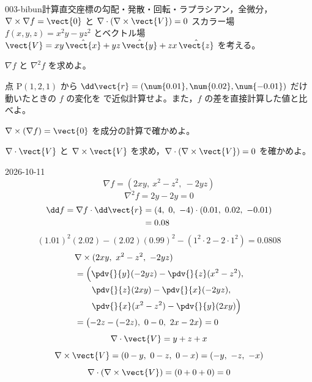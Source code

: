 \documentclass[uplatex,dvipdfmx,a4paper,11pt]{jsarticle}
\begin{document}
\begin{mondai}{003-bibun}{計算}{直交座標の勾配・発散・回転・ラプラシアン，全微分，$\nabla\times\nabla f = \vect{0}$ と $\nabla\cdot(\nabla\times\vect{V}) = 0$}
スカラー場 $f(x,y,z) = x^2y - yz^2$ とベクトル場 $\vect{V} = xy\,\hat{\vect{x}} + yz\,\hat{\vect{y}} + zx\,\hat{\vect{z}}$ を考える。
  \begin{shoumon}
    \item $\nabla f$ と $\nabla^2 f$ を求めよ。
    \item 点 $\mathrm{P}(1,2,1)$ から $\dd\vect{r} = (\num{0.01}, \num{0.02}, \num{-0.01})$ だけ動いたときの $f$ の変化を  で近似計算せよ。また，$f$ の差を直接計算した値と比べよ。
    \item $\nabla\times(\nabla f) = \vect{0}$ を成分の計算で確かめよ。
    \item $\nabla\cdot\vect{V}$ と $\nabla\times\vect{V}$ を求め，$\nabla\cdot(\nabla\times\vect{V}) = 0$ を確かめよ。
  \end{shoumon}
\begin{kotaeutsushi}{2026-10-11}
\[ \nabla f=(2xy,\ x^{2}-z^{2},\ -2yz) \]
\[ \nabla^{2}f=2y-2y=0 \]
\begin{align*}
\dd f=\nabla f\cdot\dd\vect{r}&=(4,\ 0,\ -4)\cdot(0.01,\ 0.02,\ -0.01)\\
&=0.08
\end{align*}
\[ (1.01)^{2}(2.02)-(2.02)(0.99)^{2}-(1^{2}\cdot2-2\cdot1^{2})=0.0808 \]
\begin{align*}
&\nabla\times(2xy,\ x^{2}-z^{2},\ -2yz)\\
&=\Bigl(\pdv{}{y}(-2yz)-\pdv{}{z}(x^{2}-z^{2}),\\
&\qquad\pdv{}{z}(2xy)-\pdv{}{x}(-2yz),\\
&\qquad\pdv{}{x}(x^{2}-z^{2})-\pdv{}{y}(2xy)\Bigr)\\
&=\bigl(-2z-(-2z),\ 0-0,\ 2x-2x\bigr)=0
\end{align*}
\[ \nabla\cdot\vect{V}=y+z+x \]
\[ \nabla\times\vect{V}=(0-y,\ 0-z,\ 0-x)=(-y,\ -z,\ -x) \]
\[ \nabla\cdot(\nabla\times\vect{V})=(0+0+0)=0 \]
\end{kotaeutsushi}
\end{mondai}
\end{document}
